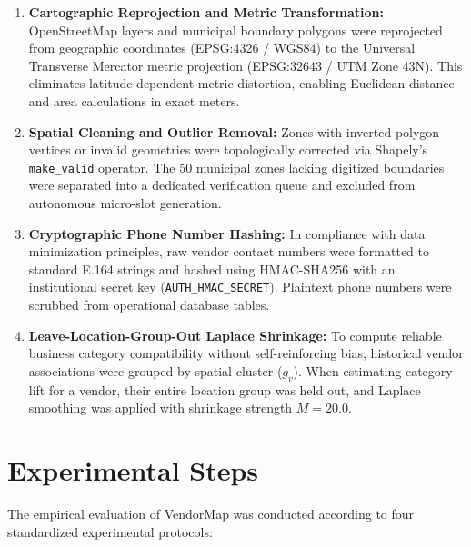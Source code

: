 \begin{enumerate}
    \item \textbf{Cartographic Reprojection and Metric Transformation:} OpenStreetMap layers and municipal boundary polygons were reprojected from geographic coordinates (EPSG:4326 / WGS84) to the Universal Transverse Mercator metric projection (EPSG:32643 / UTM Zone 43N). This eliminates latitude-dependent metric distortion, enabling Euclidean distance and area calculations in exact meters.
    \item \textbf{Spatial Cleaning and Outlier Removal:} Zones with inverted polygon vertices or invalid geometries were topologically corrected via Shapely's \texttt{make\_valid} operator. The 50 municipal zones lacking digitized boundaries were separated into a dedicated verification queue and excluded from autonomous micro-slot generation.
    \item \textbf{Cryptographic Phone Number Hashing:} In compliance with data minimization principles, raw vendor contact numbers were formatted to standard E.164 strings and hashed using HMAC-SHA256 with an institutional secret key (\texttt{AUTH\_HMAC\_SECRET}). Plaintext phone numbers were scrubbed from operational database tables.
    \item \textbf{Leave-Location-Group-Out Laplace Shrinkage:} To compute reliable business category compatibility without self-reinforcing bias, historical vendor associations were grouped by spatial cluster ($g_v$). When estimating category lift for a vendor, their entire location group was held out, and Laplace smoothing was applied with shrinkage strength $M = 20.0$.
\end{enumerate}

\section{Experimental Steps}
\label{sec:experimental_steps}

The empirical evaluation of VendorMap was conducted according to four standardized experimental protocols:

